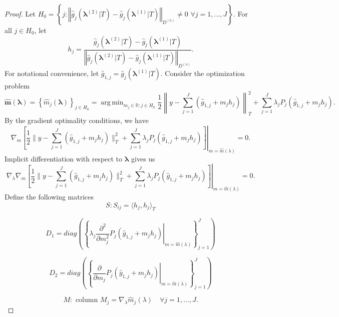 \documentclass[10pt]{book}
\theoremstyle{definition}
\DeclareMathOperator*{\argmin}{arg\,min}
\begin{document}
\begin{proof}
	Let $H_{0} = \left \{
	j:\left\Vert \hat{g}_{j}(\boldsymbol{\lambda}^{(2)}|T)-\hat{g}_{j}(\boldsymbol{\lambda}^{(1)}|T)\right\Vert _{D^{(n)}} \ne 0\,\, \forall j = 1,...,J
	\right \}$.
	For all $j \in H_0$, let 
	\[
	h_{j}=
	\frac{\hat{g}_{j}(\boldsymbol{\lambda}^{(2)}|T)-\hat{g}_{j}(\boldsymbol{\lambda}^{(1)}|T)}{\left\Vert \hat{g}_{j}(\boldsymbol{\lambda}^{(2)}|T)-\hat{g}_{j}(\boldsymbol{\lambda}^{(1)}|T)\right\Vert _{D^{(n)}}}.
	\]
	For notational convenience, let $\hat{g}_{1,j} = \hat{g}_{j}(\boldsymbol{\lambda}^{(1)}|T)$. Consider the optimization problem
	\begin{equation}
	\hat{\boldsymbol{m}}(\boldsymbol{\lambda})=\left\{ \hat{m}_{j}(\boldsymbol{\lambda})\right\} _{j\in H_0}
	=\argmin_{m_{j} \in \mathbb{R}: j\in H_0}
	\frac{1}{2}
	\left \|y-\sum_{j=1}^{J}\left(\hat{g}_{1,j}+m_{j}h_{j}\right) \right \|_{T}^{2}
	+\sum_{j=1}^{J}\lambda_{j}
	P_{j} \left (\hat{g}_{1,j}+m_{j}h_{j} \right ).
	\end{equation}
	By the gradient optimality conditions, we have
	\begin{equation}
	\nabla_{m} \left .
	\left[\frac{1}{2}\|y-\sum_{j=1}^{J}\left(\hat{g}_{1,j}+m_{j}h_{j}\right)\|_{T}^{2}+\sum_{j=1}^{J}\lambda_{j}P_{j}(\hat{g}_{1,j}+m_{j}h_{j})\right] \right |_{m=\hat{m}(\lambda)}
	= 0.
	\label{eq:nonparam_grad_opt}
	\end{equation}
	Implicit differentiation with respect to $\boldsymbol{\lambda}$ gives us
	\begin{equation}
	\nabla_\lambda 
	\nabla_m
	\left . \left[
	\frac{1}{2}\|y-\sum_{j=1}^{J}\left(\hat{g}_{1,j}+m_{j}h_{j}\right)\|_{T}^{2}+\sum_{j=1}^{J}\lambda_{j}P_{j}(\hat{g}_{1,j}+m_{j}h_{j})\right] \right |_{m=\hat{m}(\lambda)}
	= 0.
	\label{eq:nonparam_imp_diff}
	\end{equation}
	Define the following matrices
	\[
	S:S_{ij}=\langle h_{j},h_{j}\rangle_{T}
	\]
	
	\[
	D_{1}=diag\left(
	\left \{
	\left.\lambda_{j}\frac{\partial^{2}}{\partial m_{j}^{2}}P_{j}(\hat{g}_{1,j}+m_{j}h_{j})\right|_{m=\hat{m}(\lambda)}
	\right \}_{j=1}^J
	\right)
	\]
	
	
	\[
	D_{2}=diag\left(\left \{ \left.
	\frac{\partial}{\partial m_{j}}P_{j}(\hat{g}_{1,j}+m_{j}h_{j})\right|_{m=\hat{m}(\lambda)}
	\right \}_{j=1}^J
	\right)
	\]
	
	
	\[
	M:\mbox{ column }M_{j}=\nabla_{\lambda}\hat{m}_{j}(\lambda) \quad \forall j=1,...,J.
	\]
	

\end{proof}
\end{document}
